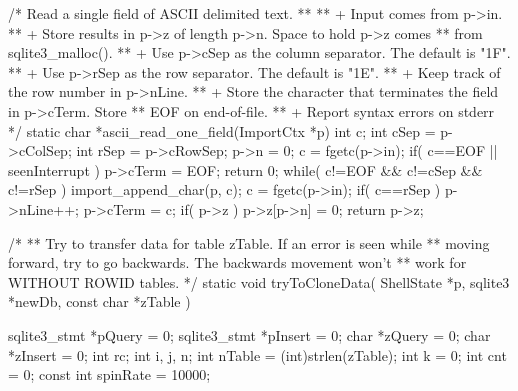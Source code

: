 \begin{Codex}[label=shell.c,numbers=left]
{/* Read a single field of ASCII delimited text.
**
**   +  Input comes from p->in.
**   +  Store results in p->z of length p->n.  Space to hold p->z comes
**      from sqlite3_malloc().
**   +  Use p->cSep as the column separator.  The default is "\x1F".
**   +  Use p->rSep as the row separator.  The default is "\x1E".
**   +  Keep track of the row number in p->nLine.
**   +  Store the character that terminates the field in p->cTerm.  Store
**      EOF on end-of-file.
**   +  Report syntax errors on stderr
*/
static char *ascii_read_one_field(ImportCtx *p){
  int c;
  int cSep = p->cColSep;
  int rSep = p->cRowSep;
  p->n = 0;
  c = fgetc(p->in);
  if( c==EOF || seenInterrupt ){
    p->cTerm = EOF;
    return 0;
  }
  while( c!=EOF && c!=cSep && c!=rSep ){
    import_append_char(p, c);
    c = fgetc(p->in);
  }
  if( c==rSep ){
    p->nLine++;
  }
  p->cTerm = c;
  if( p->z ) p->z[p->n] = 0;
  return p->z;
}

/*
** Try to transfer data for table zTable.  If an error is seen while
** moving forward, try to go backwards.  The backwards movement won't
** work for WITHOUT ROWID tables.
*/
static void tryToCloneData(
  ShellState *p,
  sqlite3 *newDb,
  const char *zTable
){
  sqlite3_stmt *pQuery = 0; 
  sqlite3_stmt *pInsert = 0;
  char *zQuery = 0;
  char *zInsert = 0;
  int rc;
  int i, j, n;
  int nTable = (int)strlen(zTable);
  int k = 0;
  int cnt = 0;
  const int spinRate = 10000;

}}
\end{Codex}
